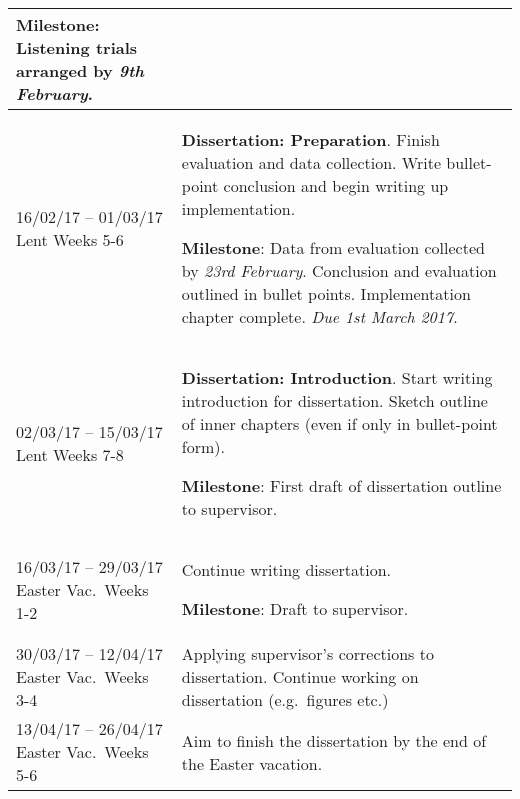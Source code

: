 \documentclass[12pt,a4paper,twoside]{article}
\begin{document}
\begin{longtable}{ p{4cm} | p{11cm} }
\textbf{Milestone}: Listening trials arranged by \emph{9th February}.
\\ \hline

16/02/17 -- 01/03/17 Lent Weeks 5-6 & \textbf{Dissertation: Preparation}.
Finish evaluation and data collection. Write bullet-point conclusion and begin
writing up implementation. \newline

\textbf{Milestone}: Data from evaluation collected by \emph{23rd February}.
Conclusion and evaluation outlined in bullet points. Implementation chapter
complete. \emph{Due 1st March 2017}.
\\ \hline

02/03/17 -- 15/03/17 Lent Weeks 7-8 & \textbf{Dissertation: Introduction}.
Start writing introduction for dissertation. Sketch outline of inner chapters
(even if only in bullet-point form).

\textbf{Milestone}: First draft of dissertation outline to supervisor.
\\ \hline

16/03/17 -- 29/03/17 Easter Vac.\ Weeks 1-2 & Continue writing dissertation. 

\textbf{Milestone}: Draft to supervisor.
\\ \hline

30/03/17 -- 12/04/17 Easter Vac.\ Weeks 3-4 & 
Applying supervisor's corrections to dissertation. Continue working on
dissertation (e.g.\ figures etc.)
\\ \hline

13/04/17 -- 26/04/17 Easter Vac.\ Weeks 5-6 & 
Aim to finish the dissertation by the end of the Easter vacation.
\\ \hline
\end{longtable}

\printbibliography
\end{document}
